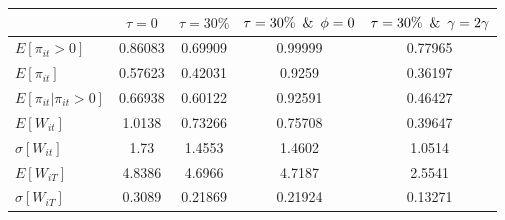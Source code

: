\begin{tabular}{lcccc}
& $\tau =0$ & $\tau =30\%$ & $\tau =30\% \hspace{0.5em}\& \hspace{0.5em} \phi = 0$ & $\tau =30\% \hspace{0.5em}\& \hspace{0.5em} \gamma = 2\gamma$ \\ 
\hline 
$E[\pi_{it}>0]$ & 0.86083 & 0.69909 & 0.99999 & 0.77965 \\ 
$E[\pi_{it}]$ & 0.57623 & 0.42031 & 0.9259 & 0.36197 \\ 
$E[\pi_{it}|\pi_{it}>0]$ & 0.66938 & 0.60122 & 0.92591 & 0.46427 \\ 
$E[W_{it}]$ & 1.0138 & 0.73266 & 0.75708 & 0.39647 \\ 
$\sigma[W_{it}]$ & 1.73 & 1.4553 & 1.4602 & 1.0514 \\ 
$E[W_{iT}]$ & 4.8386 & 4.6966 & 4.7187 & 2.5541 \\ 
$\sigma[W_{iT}]$ & 0.3089 & 0.21869 & 0.21924 & 0.13271 \\ 
\hline 
\end{tabular}